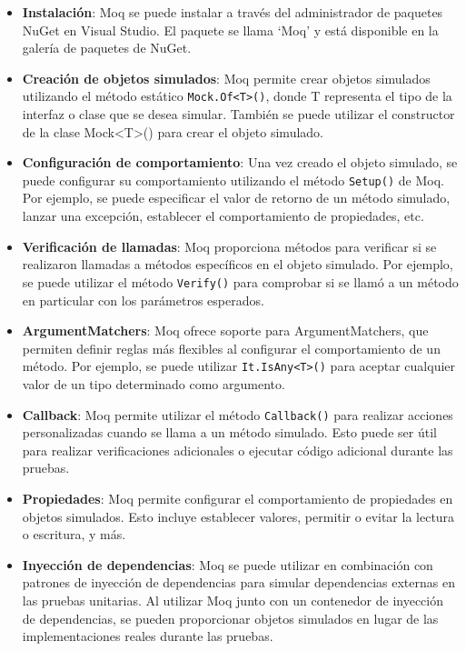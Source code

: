 \documentclass[executivepaper]{article}
\begin{document}
\begin{itemize}
\item \textbf{Instalación}: Moq se puede instalar a través del administrador de paquetes NuGet en Visual Studio. El paquete se llama \enquote*{Moq} y está disponible en la galería de paquetes de NuGet.

\item \textbf{Creación de objetos simulados}: Moq permite crear objetos simulados utilizando el método estático \lstinline{Mock.Of<T>()}, donde T representa el tipo de la interfaz o clase que se desea simular. También se puede utilizar el constructor de la clase Mock<T>() para crear el objeto simulado.

\item \textbf{Configuración de comportamiento}: Una vez creado el objeto simulado, se puede configurar su comportamiento utilizando el método \lstinline{Setup()} de Moq. Por ejemplo, se puede especificar el valor de retorno de un método simulado, lanzar una excepción, establecer el comportamiento de propiedades, etc.

\item \textbf{Verificación de llamadas}: Moq proporciona métodos para verificar si se realizaron llamadas a métodos específicos en el objeto simulado. Por ejemplo, se puede utilizar el método \lstinline{Verify()} para comprobar si se llamó a un método en particular con los parámetros esperados.

\item \textbf{ArgumentMatchers}: Moq ofrece soporte para ArgumentMatchers, que permiten definir reglas más flexibles al configurar el comportamiento de un método. Por ejemplo, se puede utilizar \lstinline{It.IsAny<T>()} para aceptar cualquier valor de un tipo determinado como argumento.

\item \textbf{Callback}: Moq permite utilizar el método \lstinline{Callback()} para realizar acciones personalizadas cuando se llama a un método simulado. Esto puede ser útil para realizar verificaciones adicionales o ejecutar código adicional durante las pruebas.

\item \textbf{Propiedades}: Moq permite configurar el comportamiento de propiedades en objetos simulados. Esto incluye establecer valores, permitir o evitar la lectura o escritura, y más.

\item \textbf{Inyección de dependencias}: Moq se puede utilizar en combinación con patrones de inyección de dependencias para simular dependencias externas en las pruebas unitarias. Al utilizar Moq junto con un contenedor de inyección de dependencias, se pueden proporcionar objetos simulados en lugar de las implementaciones reales durante las pruebas.

\end{itemize}
\end{document}
